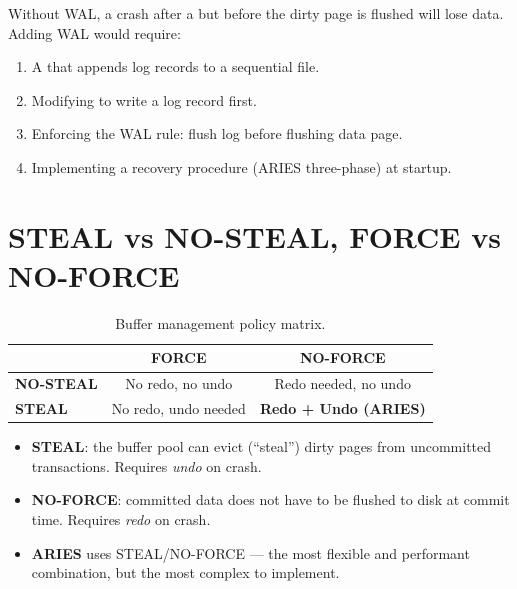 \begin{warningbox}[No WAL = No Crash Safety]
Without WAL, a crash after a  but before the dirty page is flushed will lose data.  Adding WAL would require:
\begin{enumerate}[nosep]
  \item A  that appends log records to a sequential file.
  \item Modifying  to write a log record first.
  \item Enforcing the WAL rule: flush log before flushing data page.
  \item Implementing a recovery procedure (ARIES three-phase) at startup.
\end{enumerate}
\end{warningbox}

\section{STEAL vs NO-STEAL, FORCE vs NO-FORCE}

\begin{table}[H]
\centering
\caption{Buffer management policy matrix.}
\begin{tabular}{l c c}
\toprule
 & \textbf{FORCE} & \textbf{NO-FORCE} \\
\midrule
\textbf{NO-STEAL} & No redo, no undo & Redo needed, no undo \\
\textbf{STEAL}     & No redo, undo needed & \textbf{Redo + Undo (ARIES)} \\
\bottomrule
\end{tabular}
\end{table}

\begin{itemize}[nosep]
  \item \textbf{STEAL}: the buffer pool can evict (``steal'') dirty pages from uncommitted transactions.  Requires \emph{undo} on crash.
  \item \textbf{NO-FORCE}: committed data does not have to be flushed to disk at commit time.  Requires \emph{redo} on crash.
  \item \textbf{ARIES} uses STEAL/NO-FORCE --- the most flexible and performant combination, but the most complex to implement.
\end{itemize}

